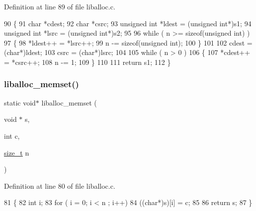 Definition at line 89 of file liballoc.\+c.


\begin{DoxyCode}
90 \{
91   \textcolor{keywordtype}{char} *cdest;
92   \textcolor{keywordtype}{char} *csrc;
93   \textcolor{keywordtype}{unsigned} \textcolor{keywordtype}{int} *ldest = (\textcolor{keywordtype}{unsigned} \textcolor{keywordtype}{int}*)s1;
94   \textcolor{keywordtype}{unsigned} \textcolor{keywordtype}{int} *lsrc  = (\textcolor{keywordtype}{unsigned} \textcolor{keywordtype}{int}*)s2;
95 
96   \textcolor{keywordflow}{while} ( n >= \textcolor{keyword}{sizeof}(\textcolor{keywordtype}{unsigned} \textcolor{keywordtype}{int}) )
97   \{
98       *ldest++ = *lsrc++;
99       n -= \textcolor{keyword}{sizeof}(\textcolor{keywordtype}{unsigned} int);
100   \}
101 
102   cdest = (\textcolor{keywordtype}{char}*)ldest;
103   csrc  = (\textcolor{keywordtype}{char}*)lsrc;
104   
105   \textcolor{keywordflow}{while} ( n > 0 )
106   \{
107       *cdest++ = *csrc++;
108       n -= 1;
109   \}
110   
111   \textcolor{keywordflow}{return} s1;
112 \}
\end{DoxyCode}
\mbox{\label{a00023_ad824e94da51543e1febb05f96f0083ba_ad824e94da51543e1febb05f96f0083ba}} 
\subsubsection{\texorpdfstring{liballoc\+\_\+memset()}{liballoc\_memset()}}
{\footnotesize\ttfamily static void$\ast$ liballoc\+\_\+memset (\begin{DoxyParamCaption}\item[{void $\ast$}]{s,  }\item[{int}]{c,  }\item[{\hyperlink{a00026_a7c94ea6f8948649f8d181ae55911eeaf_a7c94ea6f8948649f8d181ae55911eeaf}{size\+\_\+t}}]{n }\end{DoxyParamCaption})\hspace{0.3cm}{\ttfamily [static]}}



Definition at line 80 of file liballoc.\+c.


\begin{DoxyCode}
81 \{
82     \textcolor{keywordtype}{int} i;
83     \textcolor{keywordflow}{for} ( i = 0; i < n ; i++)
84         ((\textcolor{keywordtype}{char}*)s)[i] = c;
85     
86     \textcolor{keywordflow}{return} s;
87 \}
\end{DoxyCode}
\mbox{\label{a00023_a7ac38fce3243a7dcf448301ee9ffd392_a7ac38fce3243a7dcf448301ee9ffd392}} 
